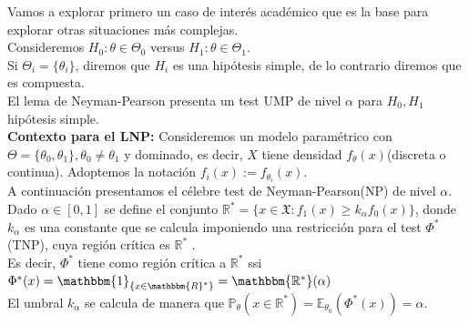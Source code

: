 \documentclass[10pt]{article}
\theoremstyle{plain}
\theoremstyle{definition}
\begin{document}
Vamos a explorar primero un caso de interés académico que es la base para explorar otras situaciones más complejas.\\
Consideremos $H_{0}: \theta \in \Theta_{0}$ versus $H_{1}: \theta \in \Theta_{1}$.\\

Si $\Theta_{i} = \{\theta_{i}\}$, diremos que $H_{i}$ es una hipótesis simple, de lo contrario diremos que es compuesta.\\

El lema de Neyman-Pearson presenta un test UMP de nivel $\alpha$ para $H_{0},H_{1}$ hipótesis simple.\\

\textbf{Contexto para el LNP:} Consideremos un modelo paramétrico con $\Theta = \{\theta_{0}, \theta_{1}\}, \theta_{0}\not =\theta_{1}$ y dominado, es decir, $X$ tiene densidad $f_{\theta}(x)$(discreta o continua). Adoptemos la notación $f_{i}(x) := f_{\theta_{i}}(x)$.\\
A continuación presentamos el célebre test de Neyman-Pearson(NP) de nivel $\alpha$.\\

Dado $\alpha \in [0,1]$ se define el conjunto $\mathbb{R}^* = \{x\in\mathfrak{X}\colon f_{1}(x) \ge k_{\alpha}f_{0}(x)\}$, donde $k_{\alpha}$ es una constante que se calcula imponiendo una restricción para el test $\Phi^*$(TNP), cuya región crítica es $\mathbb{R}^*$ .\\

Es decir, $\Phi^*$ tiene como región crítica a $\mathbb{R}^*$ ssi $\Phi^*(x)=\mathbbm{1}_{\{x\in \mathbbm{R}^*\}} = \mathbbm{\mathbb{R}^*}(\alpha)$\\

El umbral $k_{\alpha}$ se calcula de manera que $\mathbb{P}_{\theta}(x\in\mathbb{R}^*) = \mathbb{E}_{\theta_{0}}(\Phi^*(x))=\alpha$.\\
\end{document}
